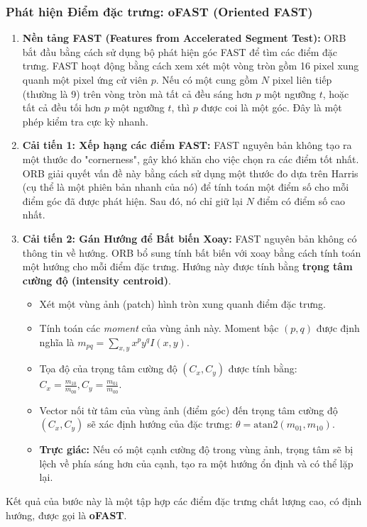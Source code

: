 \subsubsection{Phát hiện Điểm đặc trưng: oFAST (Oriented FAST)}
\label{subsubsec:orb_ofast}
\begin{enumerate}
    \item \textbf{Nền tảng FAST (Features from Accelerated Segment Test):} ORB bắt đầu bằng cách sử dụng bộ phát hiện góc FAST để tìm các điểm đặc trưng. FAST hoạt động bằng cách xem xét một vòng tròn gồm 16 pixel xung quanh một pixel ứng cử viên $p$. Nếu có một cung gồm $N$ pixel liên tiếp (thường là 9) trên vòng tròn mà tất cả đều sáng hơn $p$ một ngưỡng $t$, hoặc tất cả đều tối hơn $p$ một ngưỡng $t$, thì $p$ được coi là một góc. Đây là một phép kiểm tra cực kỳ nhanh.

    \item \textbf{Cải tiến 1: Xếp hạng các điểm FAST:} FAST nguyên bản không tạo ra một thước đo "cornerness", gây khó khăn cho việc chọn ra các điểm tốt nhất. ORB giải quyết vấn đề này bằng cách sử dụng một thước đo dựa trên Harris (cụ thể là một phiên bản nhanh của nó) để tính toán một điểm số cho mỗi điểm góc đã được phát hiện. Sau đó, nó chỉ giữ lại $N$ điểm có điểm số cao nhất.

    \item \textbf{Cải tiến 2: Gán Hướng để Bất biến Xoay:} FAST nguyên bản không có thông tin về hướng. ORB bổ sung tính bất biến với xoay bằng cách tính toán một hướng cho mỗi điểm đặc trưng. Hướng này được tính bằng \textbf{trọng tâm cường độ (intensity centroid)}.
    \begin{itemize}
        \item Xét một vùng ảnh (patch) hình tròn xung quanh điểm đặc trưng.
        \item Tính toán các \textit{moment} của vùng ảnh này. Moment bậc $(p, q)$ được định nghĩa là $m_{pq} = \sum_{x,y} x^p y^q I(x,y)$.
        \item Tọa độ của trọng tâm cường độ $(C_x, C_y)$ được tính bằng: $C_x = \frac{m_{10}}{m_{00}}, C_y = \frac{m_{01}}{m_{00}}$.
        \item Vector nối từ tâm của vùng ảnh (điểm góc) đến trọng tâm cường độ $(C_x, C_y)$ sẽ xác định hướng của đặc trưng: $\theta = \text{atan2}(m_{01}, m_{10})$.
        \item \textbf{Trực giác:} Nếu có một cạnh cường độ trong vùng ảnh, trọng tâm sẽ bị lệch về phía sáng hơn của cạnh, tạo ra một hướng ổn định và có thể lặp lại.
    \end{itemize}
\end{enumerate}
Kết quả của bước này là một tập hợp các điểm đặc trưng chất lượng cao, có định hướng, được gọi là \textbf{oFAST}.

